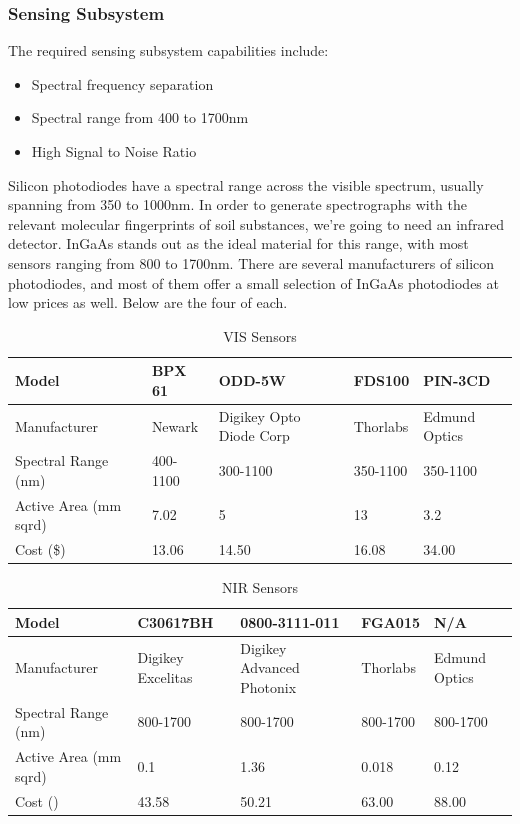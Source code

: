 \subsubsection{Sensing Subsystem}
The required sensing subsystem capabilities include:
    \begin{itemize}
        \item Spectral frequency separation
        \item Spectral range from 400 to 1700nm
        \item High Signal to Noise Ratio
    \end{itemize}


	Silicon photodiodes have a spectral range across the visible spectrum, usually spanning from 350 to 1000nm. In order to generate spectrographs with the relevant molecular fingerprints of soil substances, we're going to need an infrared detector. InGaAs stands out as the ideal material for this range, with most sensors ranging from 800 to 1700nm. There are several manufacturers of silicon photodiodes, and most of them offer a small selection of InGaAs photodiodes at low prices as well. Below are the four of each.


\begin{table}[H]
	\centering
	\label{table:VISsensors}
	\caption{VIS Sensors}
	\begin{tabular}{|p{2cm}|l|l|l|l|}
	\hline    
	Model & BPX 61 & ODD-5W & FDS100 & PIN-3CD\\
    \hline
	Manufacturer & Newark & Digikey Opto Diode Corp & Thorlabs & Edmund Optics\\
    \hline
	Spectral Range (nm) & 400-1100 & 300-1100 & 350-1100 & 350-1100\\
    \hline
	Active Area (mm sqrd) & 7.02 & 5 & 13 & 3.2\\
    \hline
	Cost (\$) & 13.06 & 14.50 & 16.08 & 34.00\\
    \hline
	\end{tabular}
\end{table}



\begin{table}[H]
	\centering
	\label{table:NIRsensors}
	\caption{NIR Sensors}
	\begin{tabular}{|p{2cm}|l|l|l|l|}
	\hline    
	Model & C30617BH & 0800-3111-011 & FGA015 & N/A\\
	\hline
	Manufacturer & Digikey Excelitas & Digikey Advanced Photonix & Thorlabs & Edmund Optics\\
	\hline
	Spectral Range (nm) & 800-1700 & 800-1700 & 800-1700 & 800-1700\\
	\hline
	Active Area (mm sqrd) & 0.1 & 1.36 & 0.018 & 0.12\\
	\hline
	Cost (\textdollar) & 43.58 & 50.21 & 63.00 & 88.00 \\
	\hline
	\end{tabular}
\end{table}


